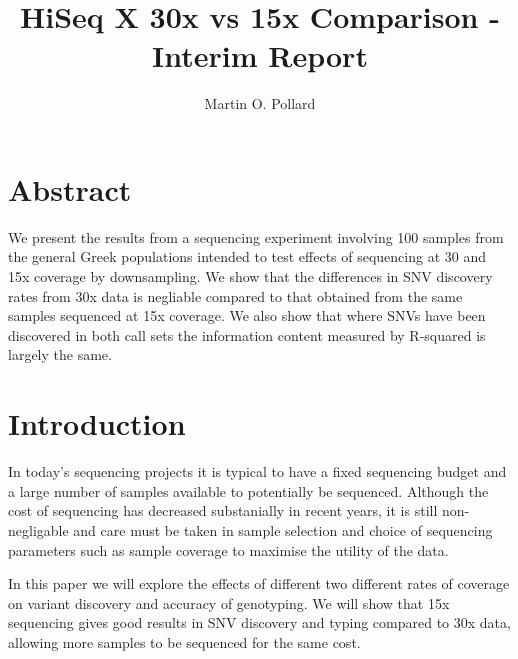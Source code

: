 \documentclass{article}
\title{HiSeq X 30x vs 15x Comparison - Interim Report}
\author{Martin O. Pollard}
\begin{document}
  \maketitle
  \newpage
  \tableofcontents
  \newpage
  \section{Abstract}
  {We present the results from a sequencing experiment involving 100 samples from the general Greek populations intended to test effects of sequencing at 30 and 15x coverage by downsampling. We show that the differences in SNV discovery rates from 30x data is negliable compared to that obtained from the same samples sequenced at 15x coverage. We also show that where SNVs have been discovered in both call sets the information content measured by R-squared is largely the same.}

  \section{Introduction}

  {In today's sequencing projects it is typical to have a fixed sequencing budget and a large number of samples available to potentially be sequenced. Although the cost of sequencing has decreased substanially in recent years, it is still non-negligable and care must be taken in sample selection and choice of sequencing parameters such as sample coverage to maximise the utility of the data.}

  {In this paper we will explore the effects of different two different rates of coverage on variant discovery and accuracy of genotyping. We will show that 15x sequencing gives good results in SNV discovery and typing compared to 30x data, allowing more samples to be sequenced for the same cost.}
\end{document}
